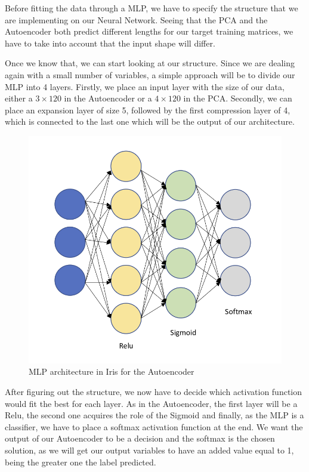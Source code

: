 Before fitting the data through a MLP, we have to specify the structure that we are implementing on our Neural Network. Seeing that the PCA and the Autoencoder both predict different lengths for our target training matrices, we have to take into account that the input shape will differ. \par

Once we know that, we can start looking at our structure. Since we are dealing again with a small number of variables, a simple approach will be to divide our MLP into 4 layers. Firstly, we place an input layer with the size of our data, either a $3\times120$ in the Autoencoder or a $4\times120$ in the PCA. Secondly, we can place an expansion layer of size 5, followed by the first compression layer of 4, which is connected to the last one which will be the output of our architecture. \par

\begin{figure}[H]
	
	\includegraphics[width=0.8\linewidth]{Figuras_tfg/Example_MLP_Auto.png}
	\caption{MLP architecture in Iris for the Autoencoder}
	\label{fig:figure_MLP_Iris_Autoencoder}
\end{figure}

After figuring out the structure, we now have to decide which activation function would fit the best for each layer. As in the Autoencoder, the first layer will be a Relu, the second one acquires the role of the Sigmoid and finally, as the MLP is a classifier, we have to place a softmax activation function at the end. We want the output of our Autoencoder to be a decision and the softmax is the chosen solution, as we will get our output variables to have an added value equal to 1, being the greater one the label predicted. \par

